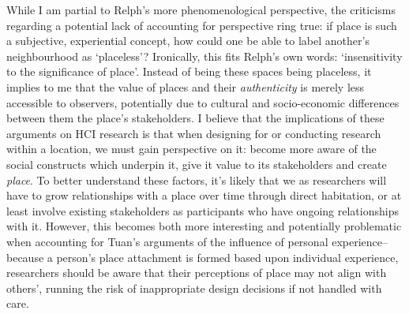 While I am partial to Relph's more phenomenological perspective, the criticisms regarding a potential lack of accounting for perspective ring true: if place is such a subjective, experiential concept, how could one be able to label another's neighbourhood as `placeless'? Ironically, this fits Relph's own words: `insensitivity to the significance of place'. Instead of being these spaces being placeless, it implies to me that the value of places and their \textit{authenticity} is merely less accessible to observers, potentially due to cultural and socio-economic differences between them the place's stakeholders. I believe that the implications of these arguments on HCI research is that when designing for or conducting research within a location, we must gain perspective on it: become more aware of the social constructs which underpin it, give it value to its stakeholders and create \textit{place}. To better understand these factors, it's likely that we as researchers will have to grow relationships with a place over time through direct habitation, or at least involve existing stakeholders as participants who have ongoing relationships with it. However, this becomes both more interesting and potentially problematic when accounting for Tuan's arguments of the influence of personal experience--because a person's place attachment is formed based upon individual experience, researchers should be aware that their perceptions of place may not align with others', running the risk of inappropriate design decisions if not handled with care. 

